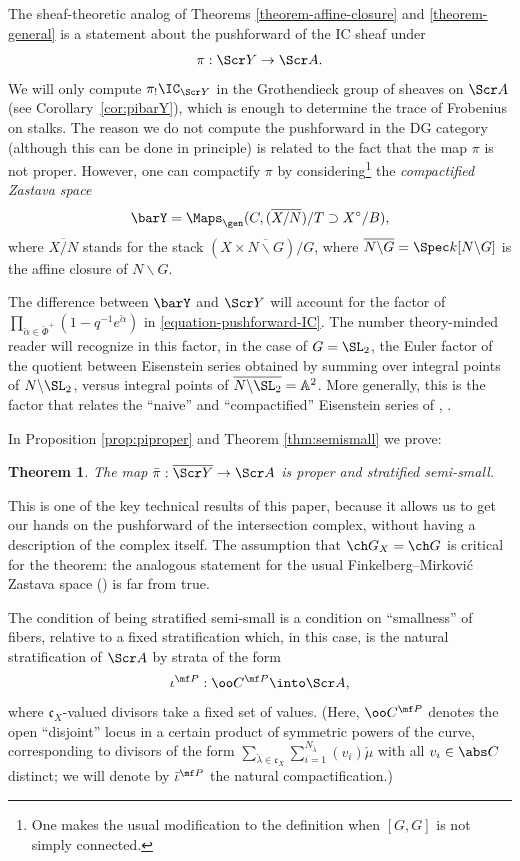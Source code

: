 \documentclass[final]{amsart}
\newtheorem{thm}[subsubsection]{Theorem}
\theoremstyle{remark}
\theoremstyle{definition}
\numberwithin{equation}{section}
\begin{document}
The sheaf-theoretic analog of Theorems \ref{theorem-affine-closure} and \ref{theorem-general} is a statement about the pushforward of the IC sheaf under 
\[ \pi: \Scr Y \to \Scr A.\]
We will only compute $\pi_! \IC_{\Scr Y}$ in the Grothendieck group of sheaves on $\Scr A$ 
(see Corollary~\ref{cor:pibarY}), which is enough to determine the trace of Frobenius on stalks. 
The reason we do not compute the pushforward in the DG category (although this can be done in principle)
is related to the fact that the map $\pi$ is not proper. 
However, one can compactify $\pi$ by considering\footnote{One makes the usual modification to the definition when $[G,G]$ is not simply connected.} the \emph{compactified Zastava space} 
\[ \barY =   \Maps_\gen(C, (\overline{X/N})/T \supset X^\circ/B),  \]
where $\overline{X/N}$ stands for the stack $(X\times \overline{N\backslash G})/G$, where $\overline{N\backslash G}= \Spec k[N\backslash G]$ is the affine closure of $N\backslash G$. 

The difference between $\barY$ and $\Scr Y$ will account for the factor of $\prod_{\check\alpha\in\check\Phi^+} (1-q^{-1} e^{\check\alpha})$ in \eqref{equation-pushforward-IC}. The number theory-minded reader will recognize in this factor, in the case of $G=\SL_2$, the Euler factor of the quotient between Eisenstein series obtained by summing over integral points of $N\backslash \SL_2$, versus integral points of $\overline{N\backslash \SL_2}=\mathbb A^2$. More generally, this is the factor that relates the ``naive'' and ``compactified'' Eisenstein series of \cite{BG}, \cite{BFGM}.

\smallskip

In Proposition \ref{prop:piproper} and Theorem \ref{thm:semismall} we prove:
\begin{thm}
\label{theorem-semismall}
 The map $\bar\pi: \overline{\Scr Y}\to \Scr A$ is proper and stratified semi-small.
\end{thm}
This is one of the key technical results of this paper, because it allows us to get our hands on the pushforward of the intersection complex, without having a description of the complex itself. 
The assumption that $\ch G_X=\ch G$ is critical for the theorem: the analogous statement 
for the usual Finkelberg--Mirkovi\'c Zastava space (\cite{FM, BFGM}) is far from true. 

The condition of being stratified semi-small is a condition on ``smallness'' of fibers, relative to a fixed stratification which, in this case, is the natural stratification of $\Scr A$ by strata of the form
\[ \iota^{\mf P}: \oo C^{\mf P} \into \Scr A, \] 
where $\mathfrak c_X$-valued divisors take a fixed set of values. (Here, $\oo C^{\mf P}$ denotes the open ``disjoint'' locus in a certain product of symmetric powers of the curve, corresponding to divisors of the form $\sum_{\check\lambda \in\mathfrak c_X} \sum_{i=1}^{N_{\check\lambda}} (v_i) \check\mu$ with all $v_i \in \abs C$ distinct; we will denote by $\bar\iota^{\mf P}$ the natural compactification.)
\end{document}
